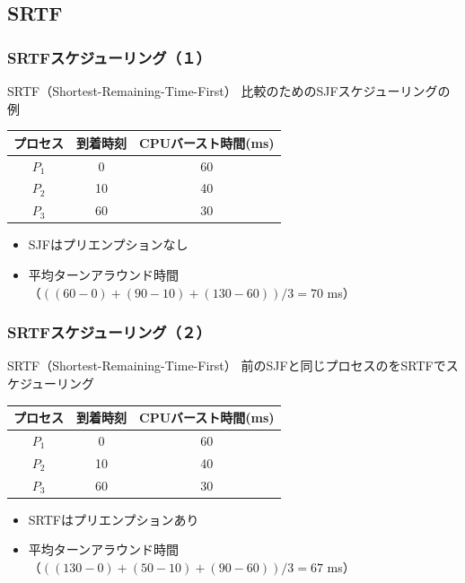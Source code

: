 \documentclass[unicode,handout]{beamer}                   %
\begin{document}
\subsection{SRTF}
\begin{frame}
  \frametitle{SRTFスケジューリング（１）}
  SRTF（Shortest-Remaining-Time-First）
  \vfill
  比較のためのSJFスケジューリングの例
  \vfill
  \small\begin{tabular}{c c c}
    プロセス & 到着時刻 & CPUバースト時間(ms) \\
    \hline
    $P_1$    & 0  & 60 \\
    $P_2$    & 10 & 40 \\
    $P_3$    & 60 & 30 \\
  \end{tabular}
  \vfill
  \vfill
  \begin{itemize}
    \item SJFはプリエンプションなし
    \item 平均ターンアラウンド時間\\
      （$((60-0)+(90-10)+(130-60))/3=70$ ms）
  \end{itemize}
  \vfill
\end{frame}

\begin{frame}
  \frametitle{SRTFスケジューリング（２）}
  SRTF（Shortest-Remaining-Time-First）
  \vfill
  前のSJFと同じプロセスのをSRTFでスケジューリング
  \vfill
  \small\begin{tabular}{c c c}
    プロセス & 到着時刻 & CPUバースト時間(ms) \\
    \hline
    $P_1$    & 0  & 60 \\
    $P_2$    & 10 & 40 \\
    $P_3$    & 60 & 30 \\
  \end{tabular}
  \vfill
  \vfill
  \begin{itemize}
    \item SRTFはプリエンプションあり
    \item 平均ターンアラウンド時間\\
      （$((130-0)+(50-10)+(90-60))/3=67$ ms）
  \end{itemize}
  \vfill
\end{frame}

\end{document}

